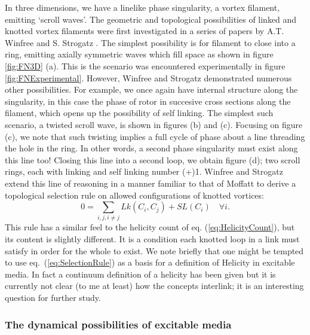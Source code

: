 In three dimensions, we have a linelike phase singularity, a vortex filament, emitting `scroll waves'. The geometric and topological possibilities of linked and knotted vortex filaments were first investigated in a series of papers by A.T. Winfree and S. Strogatz \citep{Winfree1983, Winfree1983b, Winfree1983c, Winfree1984}. The simplest possibility is for filament to close into a ring, emitting axially symmetric waves which fill space as shown in figure \ref{fig:FN3D} (a). This is the scenario was encountered experimentally in figure \ref{fig:FNExperimental}. However, Winfree and Strogatz demonstrated numerous other possibilities. For example, we once again have internal structure along the singularity, in this case the phase of rotor in succesive cross sections along the filament, which opens up the possibility of self linking. The simplest such scenario, a twisted scroll wave, is shown in figures (b) and (c). Focusing on figure (c), we note that such twisting implies a full cycle of phase about a line threading the hole in the ring. In other words, a second phase singularity must exist along this line too! Closing this line into a second loop, we obtain figure (d); two scroll rings, each with linking and self linking number (+)1. Winfree and Strogatz extend this line of reasoning in a manner familiar to that of Moffatt \citep{Moffatt1969} to derive a topological selection rule on allowed configurations of knotted vortices: 
\begin{equation}
    0 = \sum_{i,j, i\neq j} Lk(C_i,C_j) + SL(C_i) \quad \forall i. 
    \label{eq:SelectionRule}
\end{equation}
This rule has a similar feel to the helicity count of eq. (\ref{eq:HelicityCount}), but its content is slightly different. It is a condition each knotted loop in a link must satisfy in order for the whole to exist. We note briefly that one might be tempted to use eq.~(\ref{eq:SelectionRule}) as a basis for a definition of Helicity in excitable media. In fact a continuum definition of a helicity has been given \citep{Trueba2009} but it is currently not clear (to me at least) 
how the concepts interlink; it is an interesting question for further study.

\subsubsection{The dynamical possibilities of excitable media}

